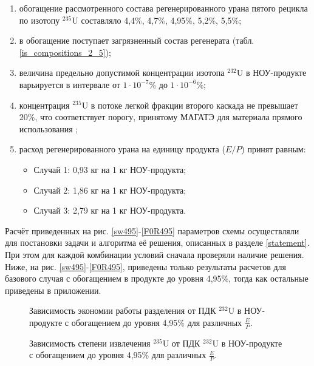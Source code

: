 \begin{enumerate}
    \item обогащение рассмотренного состава регенерированного урана пятого рецикла по изотопу $^{235}$U составляло 4,4\%, 4,7\%, 4,95\%, 5,2\%, 5,5\%;
    \item в обогащение поступает загрязненный состав регенерата (табл. \ref{is_compositions_2_5});    
    \item величина предельно допустимой концентрации изотопа $^{232}$U в НОУ-продукте варьируется в интервале от $1\cdot10^{-7}$\% до $1\cdot10^{-6}$\%;
    \item концентрация $^{235}$U в потоке легкой фракции второго каскада не превышает 20\%, что соответствует порогу, принятому МАГАТЭ для материала прямого использования \cite{alekseevConceptUseRecycled2010};
    \item расход регенерированного урана на единицу продукта ($E/P$) принят равным:
    \begin{itemize}
        \item Случай 1: 0,93 кг на 1 кг НОУ-продукта;
        \item Случай 2: 1,86 кг на 1 кг НОУ-продукта;
        \item Случай 3: 2,79 кг на 1 кг НОУ-продукта.
    \end{itemize}
\end{enumerate}

Расчёт приведенных на рис. \ref{sw495}-\ref{F0R495} параметров схемы осуществляли для постановки задачи и алгоритма её решения, описанных в разделе \ref{statement}. При этом для каждой комбинации условий сначала проверяли наличие решения. Ниже, на рис. \ref{sw495}-\ref{F0R495}, приведены только результаты расчетов для базового случая с обогащением в продукте до уровня 4,95\%, тогда как остальные приведены в приложении.


\begin{figure}
    \centering
    \begin{minipage}{.5\textwidth}
      \centering
      
\caption{{Зависимость экономии работы разделения от ПДК $^{232}$U в НОУ-продукте с обогащением до уровня 4,95\% для различных $\frac{E}{P}$.{\label{sw495}}}}
    \end{minipage}%
    \begin{minipage}{.5\textwidth}
      \centering
      
\caption{{Зависимость степени извлечения $^{235}$U от ПДК $^{232}$U в НОУ-продукте с обогащением до уровня 4,95\% для различных $\frac{E}{P}$.{\label{ex495}}}}
\end{minipage}
\end{figure}

